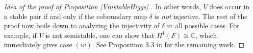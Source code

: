 \begin{proof}[Idea of the proof of Proposition \ref{VinstableHiggs} ]
	In other words, $V$ does occur in a stable pair if and only if the coboundary map $\delta$ is \textit{not} injective. The rest of the proof now boils down to analyzing the injectivity of $\delta$ in all possible cases. For example, if $V$ is not semistable, one can show that $H^1(F) \cong \mathbb{C}$, which immediately gives case $(iv)$. See Proposition 3.3 in \cite{Hitchin} for the remaining work. 
\end{proof}







 
